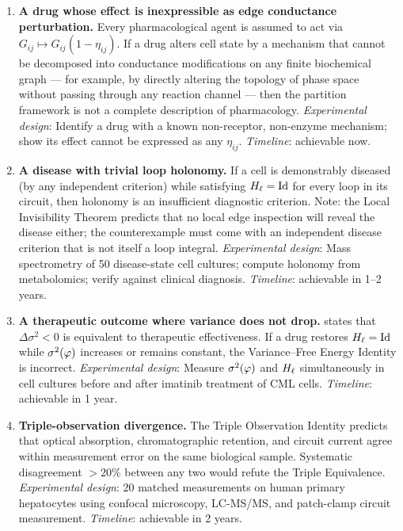 \begin{enumerate}[label=\textbf{F\arabic*.}, leftmargin=3em]

\item \textbf{A drug whose effect is inexpressible as edge conductance perturbation.}
  Every pharmacological agent is assumed to act via
  $G_{ij} \mapsto G_{ij}(1-\eta_{ij})$.  If a drug alters cell state by a
  mechanism that cannot be decomposed into conductance modifications on any
  finite biochemical graph — for example, by directly altering the topology
  of phase space without passing through any reaction channel — then the
  partition framework is not a complete description of pharmacology.
  \emph{Experimental design}: Identify a drug with a known non-receptor,
  non-enzyme mechanism; show its effect cannot be expressed as any $\eta_{ij}$.
  \emph{Timeline}: achievable now.

\item \textbf{A disease with trivial loop holonomy.}
  If a cell is demonstrably diseased (by any independent criterion) while
  satisfying $H_\ell = \mathrm{Id}$ for every loop in its circuit, then
  holonomy is an insufficient diagnostic criterion.  Note: the Local
  Invisibility Theorem predicts that no local edge inspection will reveal
  the disease either; the counterexample must come with an independent
  disease criterion that is not itself a loop integral.
  \emph{Experimental design}: Mass spectrometry of 50 disease-state cell
  cultures; compute holonomy from metabolomics; verify against clinical diagnosis.
  \emph{Timeline}: achievable in 1--2 years.

\item \textbf{A therapeutic outcome where variance does not drop.}
   states that $\Delta\sigma^2 < 0$ is equivalent
  to therapeutic effectiveness.  If a drug restores $H_\ell = \mathrm{Id}$
  while $\sigma^2(\varphi)$ increases or remains constant, the
  Variance--Free Energy Identity is incorrect.
  \emph{Experimental design}: Measure $\sigma^2(\varphi)$ and $H_\ell$
  simultaneously in cell cultures before and after imatinib treatment of
  CML cells.
  \emph{Timeline}: achievable in 1 year.

\item \textbf{Triple-observation divergence.}
  The Triple Observation Identity predicts that optical absorption,
  chromatographic retention, and circuit current agree within measurement
  error on the same biological sample.  Systematic disagreement $> 20\%$
  between any two would refute the Triple Equivalence.
  \emph{Experimental design}: 20 matched measurements on human primary
  hepatocytes using confocal microscopy, LC-MS/MS, and patch-clamp circuit
  measurement.
  \emph{Timeline}: achievable in 2 years.


\end{enumerate}
